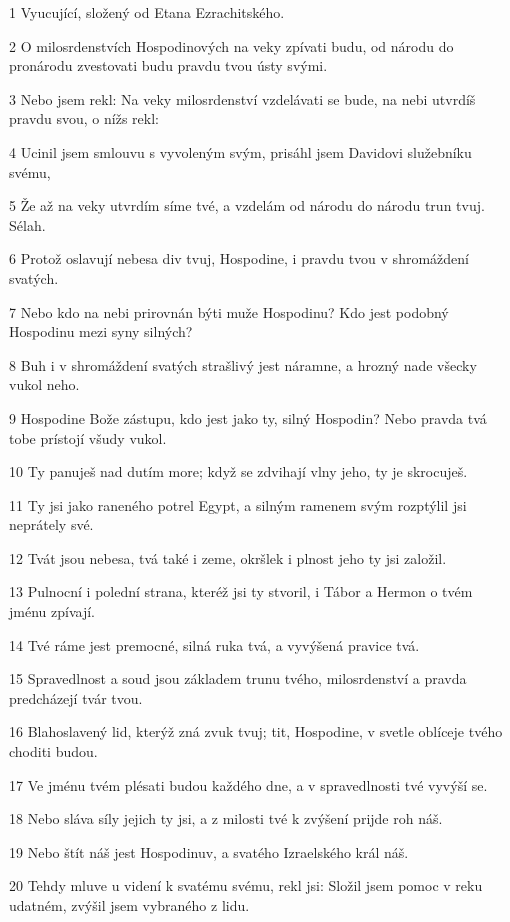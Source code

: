 \par 1 Vyucující, složený od Etana Ezrachitského.
\par 2 O milosrdenstvích Hospodinových na veky zpívati budu, od národu do pronárodu zvestovati budu pravdu tvou ústy svými.
\par 3 Nebo jsem rekl: Na veky milosrdenství vzdelávati se bude, na nebi utvrdíš pravdu svou, o nížs rekl:
\par 4 Ucinil jsem smlouvu s vyvoleným svým, prisáhl jsem Davidovi služebníku svému,
\par 5 Že až na veky utvrdím síme tvé, a vzdelám od národu do národu trun tvuj. Sélah.
\par 6 Protož oslavují nebesa div tvuj, Hospodine, i pravdu tvou v shromáždení svatých.
\par 7 Nebo kdo na nebi prirovnán býti muže Hospodinu? Kdo jest podobný Hospodinu mezi syny silných?
\par 8 Buh i v shromáždení svatých strašlivý jest náramne, a hrozný nade všecky vukol neho.
\par 9 Hospodine Bože zástupu, kdo jest jako ty, silný Hospodin? Nebo pravda tvá tobe prístojí všudy vukol.
\par 10 Ty panuješ nad dutím more; když se zdvihají vlny jeho, ty je skrocuješ.
\par 11 Ty jsi jako raneného potrel Egypt, a silným ramenem svým rozptýlil jsi neprátely své.
\par 12 Tvát jsou nebesa, tvá také i zeme, okršlek i plnost jeho ty jsi založil.
\par 13 Pulnocní i polední strana, kteréž jsi ty stvoril, i Tábor a Hermon o tvém jménu zpívají.
\par 14 Tvé ráme jest premocné, silná ruka tvá, a vyvýšená pravice tvá.
\par 15 Spravedlnost a soud jsou základem trunu tvého, milosrdenství a pravda predcházejí tvár tvou.
\par 16 Blahoslavený lid, kterýž zná zvuk tvuj; tit, Hospodine, v svetle oblíceje tvého choditi budou.
\par 17 Ve jménu tvém plésati budou každého dne, a v spravedlnosti tvé vyvýší se.
\par 18 Nebo sláva síly jejich ty jsi, a z milosti tvé k zvýšení prijde roh náš.
\par 19 Nebo štít náš jest Hospodinuv, a svatého Izraelského král náš.
\par 20 Tehdy mluve u videní k svatému svému, rekl jsi: Složil jsem pomoc v reku udatném, zvýšil jsem vybraného z lidu.
